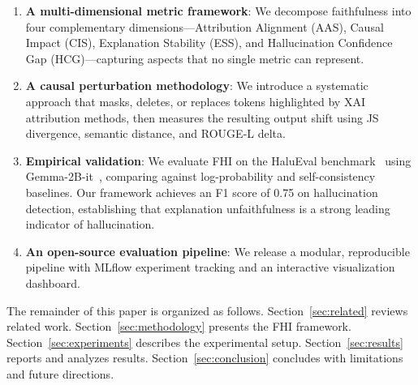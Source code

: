 \begin{enumerate}
    \item \textbf{A multi-dimensional metric framework}: We decompose faithfulness into four complementary dimensions---Attribution Alignment (AAS), Causal Impact (CIS), Explanation Stability (ESS), and Hallucination Confidence Gap (HCG)---capturing aspects that no single metric can represent.
    
    \item \textbf{A causal perturbation methodology}: We introduce a systematic approach that masks, deletes, or replaces tokens highlighted by XAI attribution methods, then measures the resulting output shift using JS divergence, semantic distance, and ROUGE-L delta.
    
    \item \textbf{Empirical validation}: We evaluate FHI on the HaluEval benchmark~\cite{li2023halueval} using Gemma-2B-it~\cite{team2024gemma}, comparing against log-probability and self-consistency baselines. Our framework achieves an F1 score of 0.75 on hallucination detection, establishing that explanation unfaithfulness is a strong leading indicator of hallucination.
    
    \item \textbf{An open-source evaluation pipeline}: We release a modular, reproducible pipeline with MLflow experiment tracking and an interactive visualization dashboard.
\end{enumerate}

The remainder of this paper is organized as follows. Section~\ref{sec:related} reviews related work. Section~\ref{sec:methodology} presents the FHI framework. Section~\ref{sec:experiments} describes the experimental setup. Section~\ref{sec:results} reports and analyzes results. Section~\ref{sec:conclusion} concludes with limitations and future directions.
